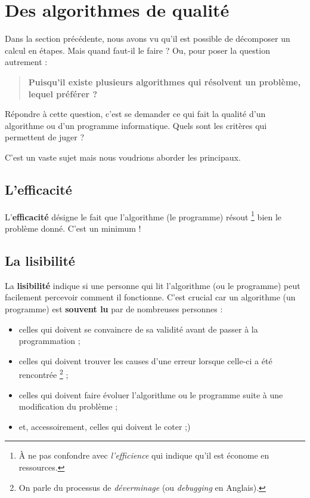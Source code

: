 	\section{Des algorithmes de qualité}
	
		Dans la section précédente,
		nous avons vu qu'il est possible de décomposer un calcul en étapes.
		Mais quand faut-il le faire ?	
		Ou, pour poser la question autrement :
		
			\begin{quote}
				\textbf{Puisqu'il existe plusieurs algorithmes 
				qui résolvent un problème, lequel préférer ?}
			\end{quote}
		
		Répondre à cette question, 
		c'est se demander ce qui fait la qualité d'un algorithme
		ou d'un programme informatique.
		Quels sont les critères qui permettent de juger ?
		
		C'est un vaste sujet mais nous voudrions aborder les principaux.
		
		\subsection{L'efficacité}
			
			L'\textbf{efficacité}
			désigne le fait que l'algorithme (le programme) résout%
			\footnote{%
				À ne pas confondre avec \emph{l'efficience}
				qui indique qu'il est économe en ressources.
			}
			bien le problème donné.
			C'est un minimum !
		
		\subsection{La lisibilité}
		
			La \textbf{lisibilité}
			indique si une personne qui lit l'algorithme
			(ou le programme)
			peut facilement percevoir comment il fonctionne.
			C'est crucial car un algorithme (un programme) 
			est \textbf{souvent lu} par de nombreuses personnes :
			\begin{itemize}
			\item
				celles qui doivent se convaincre de sa validité
				avant de passer à la programmation ;
			\item
				celles qui doivent trouver les causes
				d'une erreur lorsque celle-ci a été rencontrée%
				\footnote{%
					On parle du processus de \emph{déverminage}
					(ou \emph{debugging} en Anglais).%
				} ;
			\item
				celles qui doivent faire évoluer l'algorithme
				ou le programme suite à une modification
				du problème ;
			\item
				et, accessoirement, celles qui doivent le coter ;)
			\end{itemize}
			
